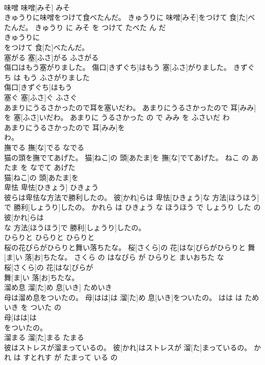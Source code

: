\documentclass[8pt]{extreport}
\begin{document}
\begin{CJK}{UTF8}{min}
\\	味噌	味噌[みそ]	みそ	
\\	きゅうりに味噌をつけて食べたんだ。	きゅうりに 味噌[みそ]をつけて 食[た]べたんだ。	きゅうり に みそ を つけて たべた ん だ	
\\	きゅうりに
\\	をつけて 食[た]べたんだ。			
\\	塞がる	塞[ふさ]がる	ふさがる	
\\	傷口はもう塞がりました。	傷口[きずぐち]はもう 塞[ふさ]がりました。	きずぐち は もう ふさがりました	
\\	傷口[きずぐち]はもう
\\	塞ぐ	塞[ふさ]ぐ	ふさぐ	
\\	あまりにうるさかったので耳を塞いだわ。	あまりにうるさかったので 耳[みみ]を 塞[ふさ]いだわ。	あまりに うるさかった の で みみ を ふさいだ わ	
\\	あまりにうるさかったので 耳[みみ]を
\\	わ。			
\\	撫でる	撫[な]でる	なでる	
\\	猫の頭を撫でてあげた。	猫[ねこ]の 頭[あたま]を 撫[な]でてあげた。	ねこ の あたま を なでて あげた	
\\	猫[ねこ]の 頭[あたま]を
\\	卑怯	卑怯[ひきょう]	ひきょう	
\\	彼らは卑怯な方法で勝利したの。	彼[かれ]らは 卑怯[ひきょう]な 方法[ほうほう]で 勝利[しょうり]したの。	かれら は ひきょう な ほうほう で しょうり した の	
\\	彼[かれ]らは
\\	な 方法[ほうほう]で 勝利[しょうり]したの。			
\\	ひらりと	ひらりと	ひらりと	
\\	桜の花びらがひらりと舞い落ちたな。	桜[さくら]の 花[はな]びらがひらりと 舞[ま]い 落[お]ちたな。	さくら の はなびら が ひらりと まいおちた な	
\\	桜[さくら]の 花[はな]びらが
\\	舞[ま]い 落[お]ちたな。			
\\	溜め息	溜[た]め 息[いき]	ためいき	
\\	母は溜め息をついたの。	母[はは]は 溜[た]め 息[いき]をついたの。	はは は ためいき を ついた の	
\\	母[はは]は
\\	をついたの。			
\\	溜まる	溜[た]まる	たまる	
\\	彼はストレスが溜まっているの。	彼[かれ]はストレスが 溜[た]まっているの。	かれ は すとれす が たまって いる の	

\end{CJK}
\end{document}
